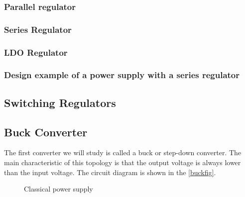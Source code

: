 \documentclass[../main.tex]{subfiles}
\begin{document}
\subsubsection{Parallel regulator}
\subsubsection{Series Regulator}
\subsubsection{LDO Regulator}
\subsubsection{Design example of a power supply with a series regulator}

\subsection{Switching Regulators}



\subsection{Buck Converter}

The first converter we will study is called a buck or step-down converter. The
main characteristic of this topology is that the output voltage is always lower than the input voltage. The circuit diagram is shown in the \autoref{buckfig}.

\begin{figure}[h]
\begin{center}

	
\caption{Classical power supply}	
\end{center}
\end{figure}
\end{document}
